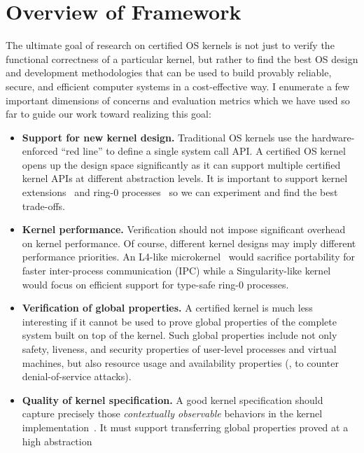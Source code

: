 
\chapter{Overview of \CTOS{} Framework}
\label{chap:overview}

The ultimate goal of research on certified OS kernels is not just
to verify the functional correctness of a particular kernel, but
rather to find the best OS design and development methodologies that
can be used to build provably reliable, secure, and efficient computer
systems in a cost-effective way. I enumerate a few important
dimensions of concerns and evaluation metrics which we have used so far
to guide our work toward realizing this goal:
\begin{itemize}
\item {\bf Support for new kernel design.}  Traditional OS kernels use
  the hardware-enforced ``red line'' to define a single system call
  API. A certified OS kernel opens up the design space significantly as
  it can support multiple certified kernel APIs at different
  abstraction levels. It is important to support kernel
  extensions~\cite{bershad95,engler95} and ring-0
  processes~\cite{hunt07} so we can experiment and find the best trade-offs.
\item {\bf Kernel performance.} Verification should not
  impose significant overhead on kernel performance. Of course,
  different kernel designs may imply different performance
  priorities.  An L4-like microkernel~\cite{liedtke95} would sacrifice
  portability for faster inter-process communication (IPC) while a
  Singularity-like kernel~\cite{hunt07} would focus on efficient
  support for type-safe ring-0 processes.
\item {\bf Verification of global properties.}
  A certified kernel is much less interesting if it cannot be
  used to prove global properties of the complete system built on top
  of the kernel.  Such global
  properties include not only safety, liveness, and security properties
  of user-level processes and virtual machines, but also resource usage
  and availability properties (\eg, to counter denial-of-service attacks).
\item {\bf Quality of kernel specification.}  A good kernel
  specification should capture precisely those {\em contextually observable}
  behaviors in the kernel implementation~\cite{dscal15}. It must
  support transferring global properties proved at a high abstraction

\end{itemize}
